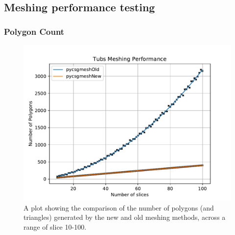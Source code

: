 \documentclass[12pt,a4paper]{article}
\begin{document}
\newpage
\subsection{Meshing performance testing}
\subsubsection{Polygon Count}

\begin{figure}[h!]
\centering
\includegraphics[scale=0.6]{Images//Quad_fits//Tubs_quad.pdf}
\caption[width=\columnwidth]{A plot showing the comparison of the number of polygons (and triangles) generated by the new and old meshing methods, across a range of slice 10-100.}
\label{conts}
\end{figure}

\newpage
\end{document}
